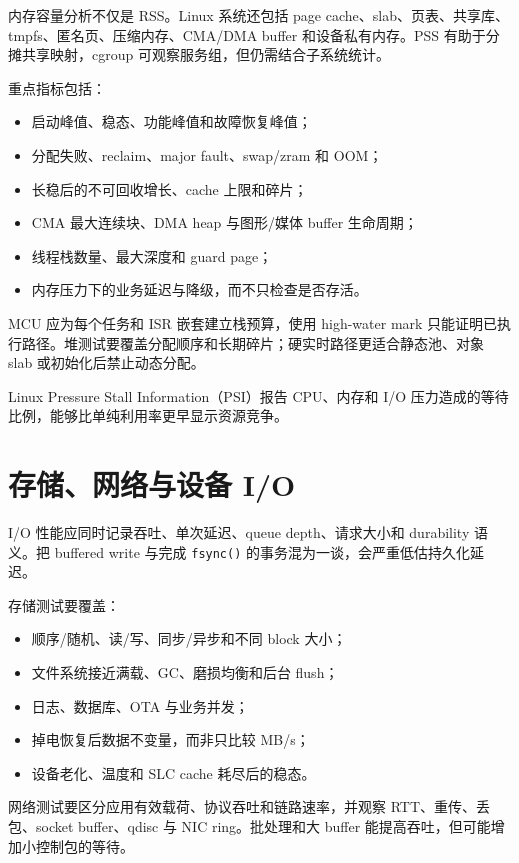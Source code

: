 内存容量分析不仅是 RSS。Linux 系统还包括 page cache、slab、页表、共享库、tmpfs、匿名页、压缩内存、CMA/DMA buffer 和设备私有内存。PSS 有助于分摊共享映射，cgroup 可观察服务组，但仍需结合子系统统计。

重点指标包括：

\begin{itemize}
  \item 启动峰值、稳态、功能峰值和故障恢复峰值；
  \item 分配失败、reclaim、major fault、swap/zram 和 OOM；
  \item 长稳后的不可回收增长、cache 上限和碎片；
  \item CMA 最大连续块、DMA heap 与图形/媒体 buffer 生命周期；
  \item 线程栈数量、最大深度和 guard page；
  \item 内存压力下的业务延迟与降级，而不只检查是否存活。
\end{itemize}

MCU 应为每个任务和 ISR 嵌套建立栈预算，使用 high-water mark 只能证明已执行路径。堆测试要覆盖分配顺序和长期碎片；硬实时路径更适合静态池、对象 slab 或初始化后禁止动态分配。

Linux Pressure Stall Information（PSI）报告 CPU、内存和 I/O 压力造成的等待比例，能够比单纯利用率更早显示资源竞争\cite{linux-psi}。

\section{存储、网络与设备 I/O}

I/O 性能应同时记录吞吐、单次延迟、queue depth、请求大小和 durability 语义。把 buffered write 与完成 \texttt{fsync()} 的事务混为一谈，会严重低估持久化延迟。

存储测试要覆盖：

\begin{itemize}
  \item 顺序/随机、读/写、同步/异步和不同 block 大小；
  \item 文件系统接近满载、GC、磨损均衡和后台 flush；
  \item 日志、数据库、OTA 与业务并发；
  \item 掉电恢复后数据不变量，而非只比较 MB/s；
  \item 设备老化、温度和 SLC cache 耗尽后的稳态。
\end{itemize}

网络测试要区分应用有效载荷、协议吞吐和链路速率，并观察 RTT、重传、丢包、socket buffer、qdisc 与 NIC ring。批处理和大 buffer 能提高吞吐，但可能增加小控制包的等待。

